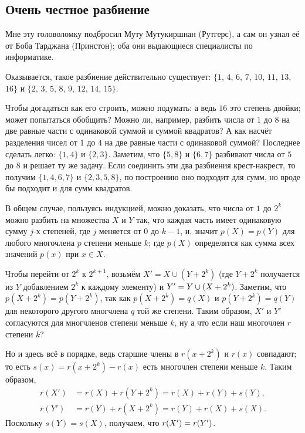 \subsection*{Очень честное разбиение}

Мне эту головоломку подбросил Муту Мутукиршнан (Рутгерс),
а сам он узнал её от Боба Тарджана (Принстон);
оба они выдающиеся специалисты по информатике.

Оказывается, такое разбиение действительно существует: $\{1$, $4$, $6$, $7$, $10$, $11$, $13$, $16\}$ и $\{2$, $3$, $5$, $8$, $9$, $12$, $14$, $15\}$.

Чтобы догадаться как его строить, можно подумать:
а ведь $16$ это степень двойки;
может попытаться обобщить?
Можно ли, например, разбить числа от $1$ до $8$ на две равные части с одинаковой суммой и суммой квадратов?
А как насчёт разделения чисел от $1$ до $4$ на две равные части с одинаковой суммой?
Последнее сделать легко: $\{1, 4\}$ и $\{2, 3\}$.
Заметим, что $\{5, 8\}$ и $\{6, 7\}$ разбивают числа от $5$ до $8$ и решает ту же задачу.
Если соединить эти два разбиения крест-накрест, то получим $\{1, 4, 6, 7\}$ и $\{2, 3, 5, 8\}$, по построению оно подходит для сумм, но вроде бы подходит и для сумм квадратов.

В общем случае, пользуясь индукцией, можно доказать, что числа от $1$ до $2^k$ можно разбить на множества $X$ и $Y$ так, что каждая часть имеет одинаковую сумму $j$-х степеней, где $j$ меняется от $0$ до $k - 1$, и, значит $p(X)=p(Y)$ для любого многочлена $p$ степени меньше $k$;
где $p(X)$ определятся как сумма всех значений $p(x)$ при $x \in X$.

Чтобы перейти от $2^{k}$ к $2^{k+1}$, возьмём $X' = X \cup (Y + 2^k)$
(где $Y + 2^k$ получается из $Y$ добавлением $2^k$ к каждому элементу) и $Y' \z= Y \cup (X + 2^k)$.
Заметим, что $p(X + 2^k) = p(Y + 2^k)$,
так как $p(X + 2^k)=q(X)$ и $p(Y + 2^k)=q(Y)$ для некоторого другого многчлена $q$ той же степени.
Таким образом, $X'$ и $Y'$ согласуются для многчленов степени меньше $k$, ну а что если наш многочлен $r$ степени $k$?

Но и здесь всё в порядке, ведь старшие члены в $r(x+2^k)$ и $r(x)$ совпадают;
то есть $s(x)=r(x+2^k)-r(x)$ есть многочлен степени меньше $k$.
Таким образом,
\begin{align*}
r(X')&=r(X)+r(Y+2^k)=r(X)+r(Y)+s(Y),
\\
r(Y')&=r(Y)+r(X+2^k)=r(Y)+r(X)+s(X).
\end{align*}
Поскольку $s(Y)=s(X)$, получаем, что $r(X')\z=r(Y')$.



